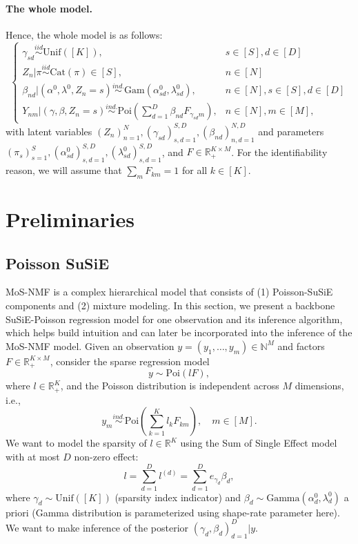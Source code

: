 \documentclass[11pt,twoside]{article}
\newcommand{\Rbb}{\ensuremath{\mathbb{R}}}
\newcommand{\Nbb}{\ensuremath{\mathbb{N}}}
\theoremstyle{plain}
\numberwithin{theorem}{section}
\numberwithin{proposition}{section}
\numberwithin{lemma}{section}
\numberwithin{definition}{section}
\numberwithin{condition}{section}
\numberwithin{problem}{section}
\numberwithin{corollary}{section}
\numberwithin{assumption}{section}
\numberwithin{example}{section}
\numberwithin{conjecture}{section}
\theoremstyle{definition}
\numberwithin{remark}{section}
\begin{document}
\paragraph{The whole model.} Hence, the whole model is as follows:
\begin{equation}\label{eq:whole-model}
\begin{cases}
\gamma_{sd} \overset{iid}{\sim} \mathrm{Unif}([K]), & s\in [S], d\in [D]\\
Z_{n} | \pi \overset{iid}{\sim} \mathrm{Cat}(\pi) \in [S], & n\in [N]\\
\beta_{nd} | (\alpha^{0}, \lambda^{0}, Z_n = s) \overset{ind.}{\sim} \mathrm{Gam}(\alpha^{0}_{sd}, \lambda^{0}_{sd}), & n\in[N], s\in [S], d\in [D]\\
Y_{nm} | (\gamma, \beta, Z_n = s) \overset{ind.}{\sim} \mathrm{Poi}(\sum_{d = 1}^{D} \beta_{nd} F_{\gamma_{sd}m}), & n\in [N], m\in [M],
\end{cases}
\end{equation}
with latent variables $(Z_n)_{n=1}^{N}, (\gamma_{sd})_{s, d = 1}^{S, D}, (\beta_{nd})_{n, d = 1}^{N, D}$ and parameters $(\pi_s)_{s=1}^{S}, (\alpha^{0}_{sd})_{s, d = 1}^{S, D}, (\lambda^{0}_{sd})_{s, d=1}^{S, D}$, and $F\in \Rbb_{+}^{K\times M}$. For the identifiability reason, we will assume that $\sum_m F_{km} = 1$ for all $k\in [K]$.

\section{Preliminaries}
\subsection{Poisson SuSiE}
MoS-NMF is a complex hierarchical model that consists of (1) Poisson-SuSiE components and (2) mixture modeling. In this section, we present a backbone SuSiE-Poisson regression model for one observation and its inference algorithm, which helps build intuition and can later be incorporated into the inference of the MoS-NMF model. Given an observation $y = (y_1, \dots, y_m) \in \Nbb^{M}$ and factors $F \in \mathbb{R}_{+}^{K\times M}$, consider the sparse regression model 
$$y \sim \mathrm{Poi}(l F),$$
where $l \in \Rbb_{+}^{K}$, and the Poisson distribution is independent across $M$ dimensions, i.e.,
$$y_m \overset{ind.}{\sim} \mathrm{Poi}(\sum_{k = 1}^{K} l_k F_{km}), \quad m\in [M]. $$
We want to model the sparsity of $l\in \Rbb^{K}$ using the Sum of Single Effect model with at most $D$ non-zero effect:
$$l = \sum_{d = 1}^{D} l^{(d)} = \sum_{d = 1}^{D} e_{\gamma_{d}} \beta_{d},$$
where $\gamma_{d} \sim \mathrm{Unif}([K])$ (sparsity index indicator) and $\beta_{d} \sim \mathrm{Gamma}(\alpha^{0}_{d}, \lambda^{0}_{d})$ a priori (Gamma distribution is parameterized using shape-rate parameter here). We want to make inference of the posterior $(\gamma_{d}, \beta_{d})_{d = 1}^{D} | y$. 
\end{document}
